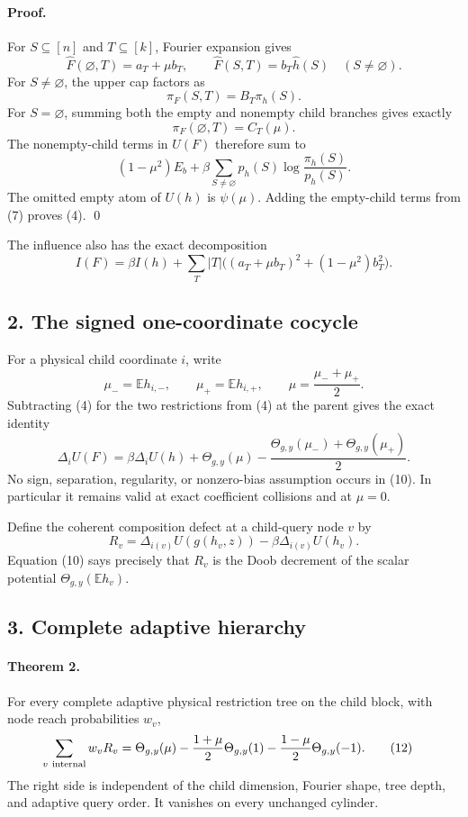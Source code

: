 \paragraph{Proof.}
For $S\subseteq[n]$ and $T\subseteq[k]$, Fourier expansion gives
\[
 \widehat F(\varnothing,T)=a_T+\mu b_T,
 \qquad
 \widehat F(S,T)=b_T\widehat h(S)\quad(S\ne\varnothing).        \tag{5}
\]
For $S\ne\varnothing$, the upper cap factors as
\[
 \pi_F(S,T)=B_T\pi_h(S).                                       \tag{6}
\]
For $S=\varnothing$, summing both the empty and nonempty child branches
gives exactly
\[
 \pi_F(\varnothing,T)=C_T(\mu).                                \tag{7}
\]
The nonempty-child terms in $U(F)$ therefore sum to
\[
 (1-\mu^2)E_b
 +\beta\sum_{S\ne\varnothing}p_h(S)
     \log\frac{\pi_h(S)}{p_h(S)}.                              \tag{8}
\]
The omitted empty atom of $U(h)$ is $\psi(\mu)$.  Adding the empty-child
terms from (7) proves (4). \qed

The influence also has the exact decomposition
\[
 I(F)=\beta I(h)+
 \sum_T |T|\bigl((a_T+\mu b_T)^2+(1-\mu^2)b_T^2\bigr).          \tag{9}
\]

\subsection*{2. The signed one-coordinate cocycle}

For a physical child coordinate $i$, write
\[
 \mu_-=\mathbb E h_{i,-},\qquad
 \mu_+=\mathbb E h_{i,+},\qquad
 \mu=\frac{\mu_-+\mu_+}{2}.
\]
Subtracting (4) for the two restrictions from (4) at the parent gives the
exact identity
\[
 \boxed{
 \Delta_iU(F)=\beta\Delta_iU(h)
 +\Theta_{g,y}(\mu)
 -\frac{\Theta_{g,y}(\mu_-)+\Theta_{g,y}(\mu_+)}2.}             \tag{10}
\]
No sign, separation, regularity, or nonzero-bias assumption occurs in (10).
In particular it remains valid at exact coefficient collisions and at
$\mu=0$.

Define the coherent composition defect at a child-query node $v$ by
\[
 R_v=\Delta_{i(v)}U(g(h_v,z))-\beta\Delta_{i(v)}U(h_v).          \tag{11}
\]
Equation (10) says precisely that $R_v$ is the Doob decrement of the scalar
potential $\Theta_{g,y}(\mathbb Eh_v)$.

\subsection*{3. Complete adaptive hierarchy}

\paragraph{Theorem 2.}
For every complete adaptive physical restriction tree on the child block,
with node reach probabilities $w_v$,
\begin{align*}
 \sum_{v\ {\rm internal}}w_vR_v
  ={}&\Theta_{g,y}(\mu)
  -\frac{1+\mu}{2}\Theta_{g,y}(1)
  -\frac{1-\mu}{2}\Theta_{g,y}(-1).                            \tag{12}
\end{align*}
The right side is independent of the child dimension, Fourier shape, tree
depth, and adaptive query order.  It vanishes on every unchanged cylinder.

